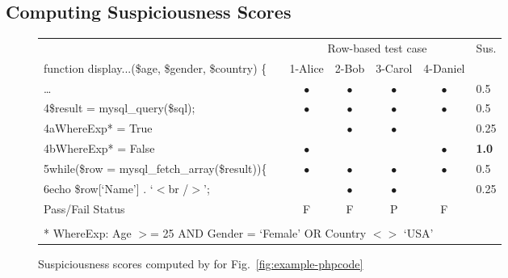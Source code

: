 \subsection{Computing Suspiciousness Scores}

\begin{figure}[t]
    \centering
    \setlength{\tabcolsep}{1pt}
    \renewcommand{\arraystretch}{1.1}
{\sffamily
 \footnotesize
\begin{tabular}{ll@{}ccccl@{}}
    \toprule
                   & & \multicolumn{4}{c}{Row-based test case} & Sus.\\
    \cmidrule{1-1}                                                                  \cmidrule{3-6}
    function display...(\$age, \$gender, \$country) \{                    & & 1-Alice             & 2-Bob             & 3-Carol   & 4-Daniel \\
    \ldots                                                                          & & $\bullet$     & $\bullet$     & $\bullet$     & $\bullet$   & 0.5\\
    4\hspace{5pt}\$result = mysql\_query(\$sql);                                   & & $\bullet$     & $\bullet$     & $\bullet$     & $\bullet$   & 0.5\\
    4a\hspace{30pt}WhereExp* = True             & &               & $\bullet$     & $\bullet$     &    & 0.25\\
    4b\hspace{30pt}WhereExp* = False                                           & & $\bullet$     &               &   & $\bullet$   & \textbf{1.0}\\
    5\hspace{5pt}while(\$row = mysql\_fetch\_array(\$result))\{                   & & $\bullet$  & $\bullet$     & $\bullet$     &  $\bullet$ & 0.5\\
    6\hspace{20pt}echo \$row[`Name'] . `$<$br /$>$';                                    & &         & $\bullet$     & $\bullet$     &  & 0.25\\
    \midrule
    Pass/Fail Status                                                                & & F             & F             & P             & F \\
    \bottomrule
    \addlinespace
    \multicolumn{6}{l}{Test case with \$age = 25, \$gender = `Female', \$country = `USA'}\\
    \multicolumn{6}{l}{* WhereExp: Age $>$= 25 AND Gender = `Female' OR Country $<>$ `USA'}
\end{tabular}
}
    \caption{Suspiciousness scores computed by \tool{} for Fig.~\ref{fig:example-phpcode}}\label{fig:suspiciousness-improved}
\end{figure}

